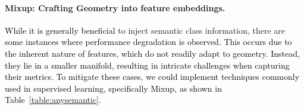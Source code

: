 \documentclass[letterpaper]{article} %
\newcommand{\nj}[1]{\textcolor{black}{#1}}
\newcommand{\jh}[1]{\textcolor{black}{#1}}
\newcommand{\yr}[1]{\textcolor{black}{#1}}
\begin{document}
\paragraph{Mixup: Crafting Geometry into feature embeddings.} 
\yr{While it is generally beneficial} to inject semantic class {information}, there are \yr{some instances where performance degradation is observed.} %
\yr{This occurs due to the inherent nature of features, which do not readily adapt to geometry. Instead, they lie in a smaller manifold, resulting in intricate challenges when capturing their metrics. To mitigate these cases, we could implement techniques commonly used in supervised learning, specifically Mixup, as shown in Table~\ref{table:anysemantic}.}
\end{document}
